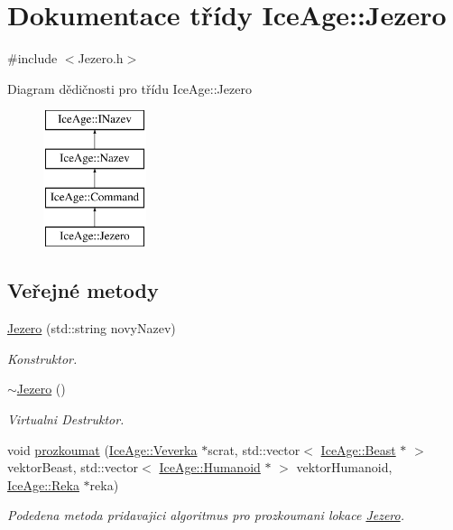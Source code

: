 \hypertarget{classIceAge_1_1Jezero}{}\section{Dokumentace třídy Ice\+Age\+:\+:Jezero}
\label{classIceAge_1_1Jezero}


{\ttfamily \#include $<$Jezero.\+h$>$}

Diagram dědičnosti pro třídu Ice\+Age\+:\+:Jezero\begin{figure}[H]
\begin{center}
\leavevmode
\includegraphics[height=4.000000cm]{d4/d46/classIceAge_1_1Jezero}
\end{center}
\end{figure}
\subsection*{Veřejné metody}
\begin{DoxyCompactItemize}
\item 
\hyperlink{classIceAge_1_1Jezero_aef3e83dcf70348c374349b8c515471d9}{Jezero} (std\+::string novy\+Nazev)
\begin{DoxyCompactList}\small\item\em Konstruktor. \end{DoxyCompactList}\item 
\hyperlink{classIceAge_1_1Jezero_ac0a6358ddc8d39f5d5c3220cf80658ae}{$\sim$\+Jezero} ()
\begin{DoxyCompactList}\small\item\em Virtualni Destruktor. \end{DoxyCompactList}\item 
void \hyperlink{classIceAge_1_1Jezero_ae105afa2b2e2c50e5b899181e6170949}{prozkoumat} (\hyperlink{classIceAge_1_1Veverka}{Ice\+Age\+::\+Veverka} $\ast$scrat, std\+::vector$<$ \hyperlink{classIceAge_1_1Beast}{Ice\+Age\+::\+Beast} $\ast$ $>$ vektor\+Beast, std\+::vector$<$ \hyperlink{classIceAge_1_1Humanoid}{Ice\+Age\+::\+Humanoid} $\ast$ $>$ vektor\+Humanoid, \hyperlink{classIceAge_1_1Reka}{Ice\+Age\+::\+Reka} $\ast$reka)
\begin{DoxyCompactList}\small\item\em Podedena metoda pridavajici algoritmus pro prozkoumani lokace \hyperlink{classIceAge_1_1Jezero}{Jezero}. \end{DoxyCompactList}\end{DoxyCompactItemize}
